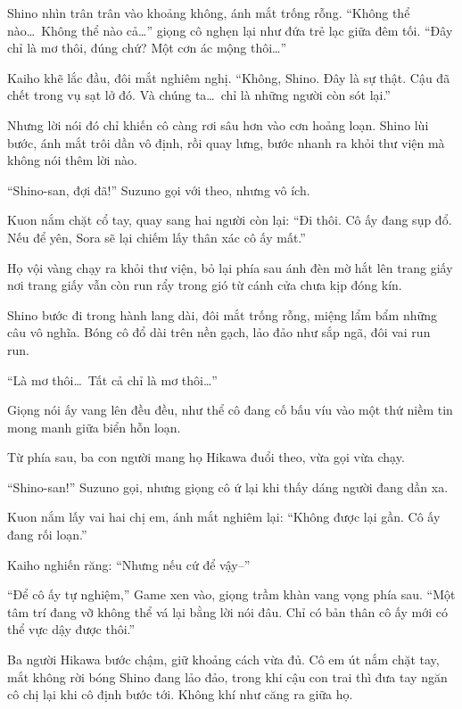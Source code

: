 \documentclass[../main.tex]{subfiles}
\begin{document}
Shino nhìn trân trân vào khoảng không, ánh mắt trống rỗng. ``Không thể nào\dots\ Không thể nào cả\dots'' giọng cô nghẹn lại như đứa trẻ lạc giữa đêm tối. ``Đây chỉ là mơ thôi, đúng chứ? Một cơn ác mộng thôi\dots''

Kaiho khẽ lắc đầu, đôi mắt nghiêm nghị. ``Không, Shino. Đây là sự thật. Cậu đã chết trong vụ sạt lở đó. Và chúng ta\dots\ chỉ là những người còn sót lại.''

Nhưng lời nói đó chỉ khiến cô càng rơi sâu hơn vào cơn hoảng loạn. Shino lùi bước, ánh mắt trôi dần vô định, rồi quay lưng, bước nhanh ra khỏi thư viện mà không nói thêm lời nào.

``Shino-san, đợi đã!'' Suzuno gọi với theo, nhưng vô ích.

Kuon nắm chặt cổ tay, quay sang hai người còn lại: ``Đi thôi. Cô ấy đang sụp đổ. Nếu để yên, Sora sẽ lại chiếm lấy thân xác cô ấy mất.''

Họ vội vàng chạy ra khỏi thư viện, bỏ lại phía sau ánh đèn mờ hắt lên trang giấy nơi trang giấy vẫn còn run rẩy trong gió từ cánh cửa chưa kịp đóng kín.

\ct

Shino bước đi trong hành lang dài, đôi mắt trống rỗng, miệng lẩm bẩm những câu vô nghĩa. Bóng cô đổ dài trên nền gạch, lảo đảo như sắp ngã, đôi vai run run.


``Là mơ thôi\dots\ Tất cả chỉ là mơ thôi\dots''

Giọng nói ấy vang lên đều đều, như thể cô đang cố bấu víu vào một thứ niềm tin mong manh giữa biển hỗn loạn.

Từ phía sau, ba con người mang họ Hikawa đuổi theo, vừa gọi vừa chạy.

``Shino-san!'' Suzuno gọi, nhưng giọng cô ứ lại khi thấy dáng người đang dần xa.

Kuon nắm lấy vai hai chị em, ánh mắt nghiêm lại: ``Không được lại gần. Cô ấy đang rối loạn.''

Kaiho nghiến răng: ``Nhưng nếu cứ để vậy--''

``Để cô ấy tự nghiệm,'' Game xen vào, giọng trầm khàn vang vọng phía sau. ``Một tâm trí đang vỡ không thể vá lại bằng lời nói đâu. Chỉ có bản thân cô ấy mới có thể vực dậy được thôi.''

Ba người Hikawa bước chậm, giữ khoảng cách vừa đủ. Cô em út nắm chặt tay, mắt không rời bóng Shino đang lảo đảo, trong khi cậu con trai thì đưa tay ngăn cô chị lại khi cô định bước tới. Không khí như căng ra giữa họ.
\end{document}
